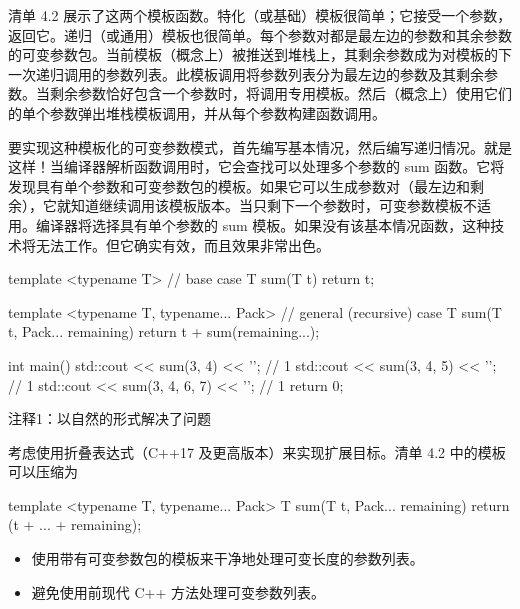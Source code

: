 清单 4.2 展示了这两个模板函数。特化（或基础）模板很简单；它接受一个参数，返回它。递归（或通用）模板也很简单。每个参数对都是最左边的参数和其余参数的可变参数包。当前模板（概念上）被推送到堆栈上，其剩余参数成为对模板的下一次递归调用的参数列表。此模板调用将参数列表分为最左边的参数及其剩余参数。当剩余参数恰好包含一个参数时，将调用专用模板。然后（概念上）使用它们的单个参数弹出堆栈模板调用，并从每个参数构建函数调用。

要实现这种模板化的可变参数模式，首先编写基本情况，然后编写递归情况。就是这样！当编译器解析函数调用时，它会查找可以处理多个参数的 sum 函数。它将发现具有单个参数和可变参数包的模板。如果它可以生成参数对（最左边和剩余），它就知道继续调用该模板版本。当只剩下一个参数时，可变参数模板不适用。编译器将选择具有单个参数的 sum 模板。如果没有该基本情况函数，这种技术将无法工作。但它确实有效，而且效果非常出色。


\begin{cpp}
template <typename T> // base case
T sum(T t) { return t; }

template <typename T, typename... Pack> // general (recursive) case
T sum(T t, Pack... remaining) { return t + sum(remaining...); }

int main() {
  std::cout << sum(3, 4) << '\n'; // 1
  std::cout << sum(3, 4, 5) << '\n'; // 1
  std::cout << sum(3, 4, 6, 7) << '\n'; // 1
  return 0;
}
\end{cpp}

{\footnotesize
注释1：以自然的形式解决了问题
}

考虑使用折叠表达式（C++17 及更高版本）来实现扩展目标。清单 4.2 中的模板可以压缩为

\begin{cpp}
template <typename T, typename... Pack>
T sum(T t, Pack... remaining) {
  return (t + ... + remaining);
}
\end{cpp}


\begin{itemize}
\item
使用带有可变参数包的模板来干净地处理可变长度的参数列表。

\item
避免使用前现代 C++ 方法处理可变参数列表。
\end{itemize}
